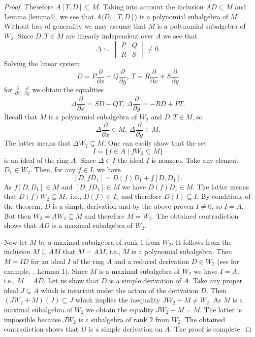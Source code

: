 \documentclass[12pt,a4paper]{amsart}
\theoremstyle{plain}
\theoremstyle{definition}
\begin{document}
{\begin{proof}
		Therefore $A[T, D] \subseteq M$. Taking into account the inclusion $AD \subseteq M$ and Lemma \ref{lemma1}, we see that $A\langle D, [T, D] \rangle$ is a polynomial subalgebra of $M$. Without loss of generality we may assume that $M$ is a polynomial subalgebra of $W_2$. Since $D, T \in M$ are linearly independent over $A$ we see that
		$$
		\Delta := \begin{vmatrix}
			P & Q \\ R & S
		\end{vmatrix} \neq 0 .$$
		Solving the linear system 
		$$
		D = P\frac{\partial}{\partial x} + Q\frac{\partial}{\partial y}, \ 		
		T = R\frac{\partial}{\partial x} + S\frac{\partial}{\partial y}
		$$
		for $ \frac{\partial}{\partial x} , \frac{\partial}{\partial y} $   we obtain the equalities 
		$$\Delta \frac{\partial}{\partial x} = SD - QT, \ \Delta \frac{\partial}{\partial y} = -R D + PT.
		$$
		Recall that  $M$ is a polynomial subalgebra of $W_2$ and $D, T\in M$, so 
		$$\Delta \frac{\partial}{\partial x} \in M, \ \Delta \frac{\partial}{\partial y} \in M.$$
		The latter means that $\Delta W_2 \subseteq M$. One can easily show that the set $$I = \{ f \in A \mid f W_2 \subseteq M \}$$
		is an ideal of the ring $A.$ Since $\Delta \in I$ the ideal $I$ is nonzero.  Take any element $D_1 \in W_2$.
		Then, for any $f \in I$, we have
		$$[D,fD_1] = D(f)D_1 + f[D,D_1].$$
		As $f[D,D_1] \in M$ and $[D,fD_1] \in M$ we have $D(f)D_1 \in M$. The latter means that 	$D(f)W_2 \subseteq M,$  i.e., $D(f)\in I,$	and therefore $D(I) \subseteq I.$		By conditions of the theorem, $D$ is a simple derivation and by the above proven  $I \neq 0$, so $I=A$. But then $W_2 =AW_2 \subseteq M$ and therefore  $M = W_2$. The obtained contradiction shows that $AD$ is a maximal subalgebra of $W_2$.
		
		Now let $M$ be a maximal subalgebra of rank $1$ from $W_2$. It follows from the inclusion $M \subseteq AM$ that $M =AM$, i.e., $M$ is a polynomial subalgebra. Then $M = ID$ for an ideal $I$ of the ring $A$ and a reduced derivation $D \in W_2$ (see for example, \cite{AMP}, Lemma 1).  Since $M$ is a maximal subalgebra of $W_2$ we have $I =A$, i.e., $M =AD$. Let us show that $D$ is a simple derivation of $A$. 		Take any proper ideal $J \subsetneq A$ which is invariant under the action of the derivation $D$. Then $(J W_2 + M)(J) \subseteq J$ which implies the inequality $JW_2+M \neq W_2$. As $M$ is a maximal subalgebra of $W_2$ we obtain the equality $JW_2+M = M$. The latter is impossible because $JW_2$ is a subalgebra of rank $2$ from $W_2$. The obtained contradiction shows that $D$ is a simple derivation on $A$. The proof is complete.
	\end{proof} 
	
}
\end{document}
